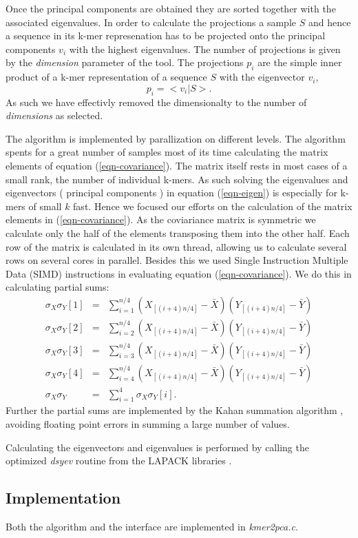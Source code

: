Once the principal components are obtained they are sorted together
with the associated eigenvalues. In order to calculate the projections
a sample $S$ and hence a sequence in its k-mer represenation has to be
projected onto the principal components $v_i$ with the highest
eigenvalues. The number of projections is given by the
\emph{dimension} parameter of the tool. The projections $p_i$ are the simple
inner product of a k-mer representation of a sequence $S$ with the
eigenvector $v_i$,
\begin{equation}
  p_i = <v_i|S>.
\end{equation}
As such we have effectivly removed the dimensionalty to the number of
\emph{dimensions} as selected.

The algorithm is implemented by parallization on different
levels. The algorithm spents for a great number of samples most of its
time calculating the matrix elements of equation
(\ref{eqn-covariance}). The matrix itself rests in most cases
of a small rank, the number of individual k-mers. As such solving the
eigenvalues and eigenvectors ( principal components ) in equation
(\ref{eqn-eigen}) is especially for k-mers of small $k$ fast. Hence we
focused our efforts on the calculation of the matrix elements in
(\ref{eqn-covariance}). As the coviariance matrix is symmetric we
calculate only the half of the elements transposing them into the
other half. Each row of the matrix is calculated in its own thread,
allowing us to calculate several rows on several cores in
parallel. Besides this we used Single Instruction Multiple Data (SIMD)
instructions in evaluating equation (\ref{eqn-covariance}). We do this
in calculating partial sums:
\begin{eqnarray}
  \sigma_X
  \sigma_Y[1]&=&\sum_{i=1}^{n/4}(X_{[(i+4)n/4]}-\bar{X})(Y_{[(i+4)n/4]}-\bar{Y}) \\
  \sigma_X
  \sigma_Y[2]&=&\sum_{i=2}^{n/4}(X_{[(i+4)n/4]}-\bar{X})(Y_{[(i+4)n/4]}-\bar{Y}) \\
  \sigma_X
  \sigma_Y[3]&=&\sum_{i=3}^{n/4}(X_{[(i+4)n/4]}-\bar{X})(Y_{[(i+4)n/4]}-\bar{Y}) \\
  \sigma_X
  \sigma_Y[4]&=&\sum_{i=4}^{n/4}(X_{[(i+4)n/4]}-\bar{X})(Y_{[(i+4)n/4]}-\bar{Y}) \\
  \sigma_X
  \sigma_Y &=& \sum_{i=1}^4\sigma_X\sigma_Y[i].
\end{eqnarray}
Further the partial sums are implemented by the Kahan summation
algorithm \cite{kahan}, avoiding floating point errors in summing a
large number of values.

Calculating the eigenvectors and eigenvalues is performed by calling
the optimized \emph{dsyev} routine from the LAPACK libraries \cite{lapack}.

\subsection{Implementation}

Both the algorithm and the interface are implemented in \emph{kmer2pca.c}.
